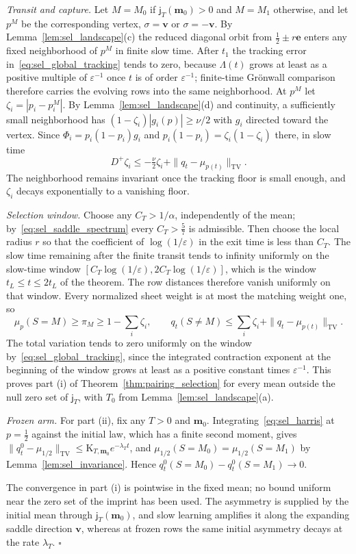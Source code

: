 \emph{Transit and capture.} Let $M=M_0$ if $\mathsf j_T(\mathbf m_0)>0$ and $M=M_1$ otherwise, and let $p^M$ be the corresponding vertex, $\sigma=\mathbf v$ or $\sigma=-\mathbf v$. By Lemma~\ref{lem:sel_landscape}(c) the reduced diagonal orbit from $\frac12\pm r\mathbf e$ enters any fixed neighborhood of $p^M$ in finite slow time. After $t_1$ the tracking error in~\eqref{eq:sel_global_tracking} tends to zero, because $\Lambda(t)$ grows at least as a positive multiple of $\varepsilon^{-1}$ once $t$ is of order $\varepsilon^{-1}$; finite-time Gr\"onwall comparison therefore carries the evolving rows into the same neighborhood. At $p^M$ let $\zeta_i=|p_i-p^M_i|$. By Lemma~\ref{lem:sel_landscape}(d) and continuity, a sufficiently small neighborhood has $(1-\zeta_i)|g_i(p)|\ge\nu/2$ with $g_i$ directed toward the vertex. Since $\Phi_i=p_i(1-p_i)g_i$ and $p_i(1-p_i)=\zeta_i(1-\zeta_i)$ there, in slow time
\[
D^+\zeta_i\le-\tfrac\nu2\zeta_i+\|q_t-\mu_{p(t)}\|_{\mathrm{TV}}.
\]
The neighborhood remains invariant once the tracking floor is small enough, and $\zeta_i$ decays exponentially to a vanishing floor.

\emph{Selection window.} Choose any $C_T>1/\alpha$, independently of the mean; by~\eqref{eq:sel_saddle_spectrum} every $C_T>\frac57$ is admissible. Then choose the local radius $r$ so that the coefficient of $\log(1/\varepsilon)$ in the exit time is less than $C_T$. The slow time remaining after the finite transit tends to infinity uniformly on the slow-time window $[C_T\log(1/\varepsilon),2C_T\log(1/\varepsilon)]$, which is the window $t_L\le t\le2t_L$ of the theorem. The row distances therefore vanish uniformly on that window. Every normalized sheet weight is at most the matching weight one, so
\[
\mu_p(S=M)\ge\pi_M\ge1-\sum_i\zeta_i,\qquad
q_t(S\ne M)\le\sum_i\zeta_i+\|q_t-\mu_{p(t)}\|_{\mathrm{TV}}.
\]
The total variation tends to zero uniformly on the window by~\eqref{eq:sel_global_tracking}, since the integrated contraction exponent at the beginning of the window grows at least as a positive constant times $\varepsilon^{-1}$. This proves part (i) of Theorem~\ref{thm:pairing_selection} for every mean outside the null zero set of $\mathsf j_T$, with $T_0$ from Lemma~\ref{lem:sel_landscape}(a).

\emph{Frozen arm.} For part (ii), fix any $T>0$ and $\mathbf m_0$. Integrating~\eqref{eq:sel_harris} at $p=\frac12$ against the initial law, which has a finite second moment, gives $\|q^0_t-\mu_{1/2}\|_{\mathrm{TV}}\le\mathrm K_{T,\mathbf m_0}e^{-\lambda_Tt}$, and $\mu_{1/2}(S=M_0)=\mu_{1/2}(S=M_1)$ by Lemma~\ref{lem:sel_invariance}. Hence $q^0_t(S=M_0)-q^0_t(S=M_1)\to0$.

The convergence in part (i) is pointwise in the fixed mean; no bound uniform near the zero set of the imprint has been used. The asymmetry is supplied by the initial mean through $\mathsf j_T(\mathbf m_0)$, and slow learning amplifies it along the expanding saddle direction $\mathbf v$, whereas at frozen rows the same initial asymmetry decays at the rate $\lambda_T$. \hfill$\square$
